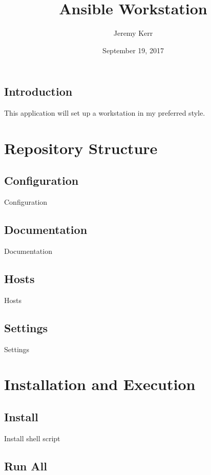 \documentclass[oneside]{book}
\title{Ansible Workstation}
\author{Jeremy Kerr}
\date{September 19, 2017}
\begin{document}
\maketitle
\tableofcontents

\section{Introduction}

This application will set up a workstation in my preferred style.

\chapter{Repository Structure}

\section{Configuration}

Configuration

\section{Documentation}

Documentation

\section{Hosts}

Hosts

\section{Settings}

Settings

\chapter{Installation and Execution}

\section{Install}

Install shell script

\section{Run All}
\end{document}
